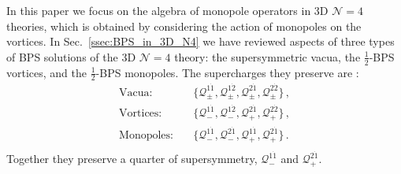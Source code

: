 \documentclass[12pt,a4paper]{article}
\renewcommand{\(}{\left(}
\renewcommand{\)}{\right)}
\renewcommand{\(}{\left(}
\renewcommand{\)}{\right)}
\begin{document}
In this paper we focus on the algebra of monopole operators in 3D $\mathcal{N}=4$ theories, which is obtained by considering the action of monopoles on the vortices. 
In Sec.~\ref{ssec:BPS_in_3D_N4} we have reviewed aspects of three types of BPS solutions of the 3D $\mathcal{N}=4$ theory: the supersymmetric vacua, the $\frac{1}{2}$-BPS vortices, and the $\frac{1}{2}$-BPS monopoles. 
The supercharges they preserve are  \cite{Bullimore:2016hdc}:
\begin{equation}\label{eq:vor_mono_SUSY}
\begin{aligned}
\text{Vacua:}&\quad \{\mathcal{Q}^{1\dot{1}}_{\pm},\mathcal{Q}^{1\dot{2}}_{\pm},\mathcal{Q}^{2\dot{1}}_{\pm},\mathcal{Q}^{2\dot{2}}_{\pm}\}\,,\\
\text{Vortices:}&\quad \{\mathcal{Q}^{1\dot{1}}_{-},\mathcal{Q}^{1\dot{2}}_{-},\mathcal{Q}^{2\dot{1}}_{+},\mathcal{Q}^{2\dot{2}}_{+}\}\,,\\
\text{Monopoles:}&\quad \{\mathcal{Q}^{1\dot{1}}_{-},\mathcal{Q}^{2\dot{1}}_{-},\mathcal{Q}^{1\dot{1}}_{+},\mathcal{Q}^{2\dot{1}}_{+}\}\,.\\
\end{aligned}
\end{equation} 
Together they preserve a quarter of supersymmetry, $\mathcal{Q}^{1\dot{1}}_{-}$ and $\mathcal{Q}^{2\dot{1}}_{+}$. 


\medskip
\end{document}
